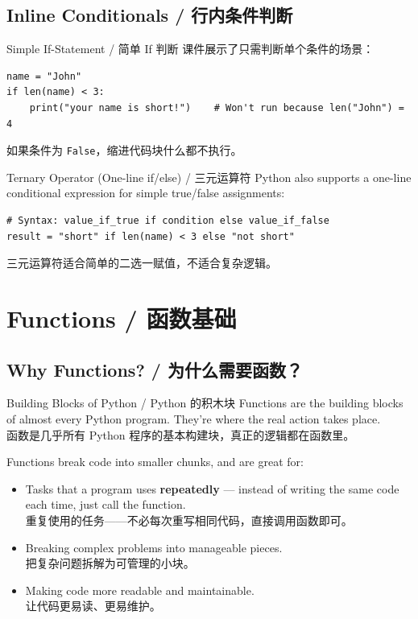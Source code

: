 \documentclass[11pt,a4paper]{report}
\let\oldtexttt\texttt
\renewcommand{\texttt}[1]{\textcolor{mainblue}{\oldtexttt{#1}}}
\begin{document}
\subsection{Inline Conditionals / 行内条件判断}

\begin{examplebox}{Simple If-Statement / 简单 If 判断}
    课件展示了只需判断单个条件的场景：
\begin{lstlisting}
name = "John"
if len(name) < 3:
    print("your name is short!")    # Won't run because len("John") = 4
\end{lstlisting}
    如果条件为 \texttt{False}，缩进代码块什么都不执行。
\end{examplebox}

\begin{concept}{Ternary Operator (One-line if/else) / 三元运算符}
    Python also supports a one-line conditional expression for simple true/false assignments:
\begin{lstlisting}
# Syntax: value_if_true if condition else value_if_false
result = "short" if len(name) < 3 else "not short"
\end{lstlisting}
    三元运算符适合简单的二选一赋值，不适合复杂逻辑。
\end{concept}

\section{Functions / 函数基础}

\subsection{Why Functions? / 为什么需要函数？}

\begin{concept}{Building Blocks of Python / Python 的积木块}
    Functions are the building blocks of almost every Python program. They're where the real action takes place. \\
    函数是几乎所有 Python 程序的基本构建块，真正的逻辑都在函数里。

    Functions break code into smaller chunks, and are great for:
    \begin{itemize}[itemsep=0.3em]
        \item Tasks that a program uses \textbf{repeatedly} — instead of writing the same code each time, just call the function. \\
        重复使用的任务——不必每次重写相同代码，直接调用函数即可。
        \item Breaking complex problems into manageable pieces. \\
        把复杂问题拆解为可管理的小块。
        \item Making code more readable and maintainable. \\
        让代码更易读、更易维护。
    \end{itemize}
\end{concept}
\end{document}
